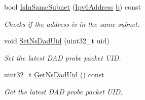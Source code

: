 \begin{DoxyCompactItemize}
bool \hyperlink{classns3_1_1Ipv6InterfaceAddress_a925da66d57c8a5d52c6ac432e027674a}{Is\+In\+Same\+Subnet} (\hyperlink{classns3_1_1Ipv6Address}{Ipv6\+Address} \hyperlink{lte__pathloss_8m_a21ad0bd836b90d08f4cf640b4c298e7c}{b}) const 
\begin{DoxyCompactList}\small\item\em Checks if the address is in the same subnet. \end{DoxyCompactList}\item 
void \hyperlink{classns3_1_1Ipv6InterfaceAddress_a4c0796f13049e78011b78dcfff02826a}{Set\+Ns\+Dad\+Uid} (uint32\+\_\+t uid)
\begin{DoxyCompactList}\small\item\em Set the latest D\+AD probe packet U\+ID. \end{DoxyCompactList}\item 
uint32\+\_\+t \hyperlink{classns3_1_1Ipv6InterfaceAddress_a354ee5902fab56152d3d3af441554c87}{Get\+Ns\+Dad\+Uid} () const 
\begin{DoxyCompactList}\small\item\em Get the latest D\+AD probe packet U\+ID. \end{DoxyCompactList}\end{DoxyCompactItemize}
